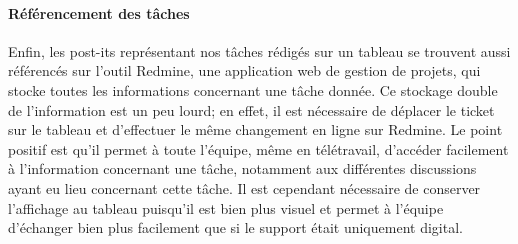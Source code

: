 \paragraph{Référencement des tâches}
Enfin, les post-its représentant nos tâches rédigés sur un tableau se trouvent aussi référencés sur l'outil Redmine, une application web de gestion de projets, qui stocke toutes les informations concernant une tâche donnée.
Ce stockage double de l'information est un peu lourd; en effet, il est nécessaire de déplacer le ticket sur le tableau et d'effectuer le même changement en ligne sur Redmine.
Le point positif est qu'il permet à toute l'équipe, même en télétravail, d'accéder facilement à l'information concernant une tâche, notamment aux différentes discussions ayant eu lieu concernant cette tâche.
Il est cependant nécessaire de conserver l'affichage au tableau puisqu'il est bien plus visuel et permet à l'équipe d'échanger bien plus facilement que si le support était uniquement digital.
